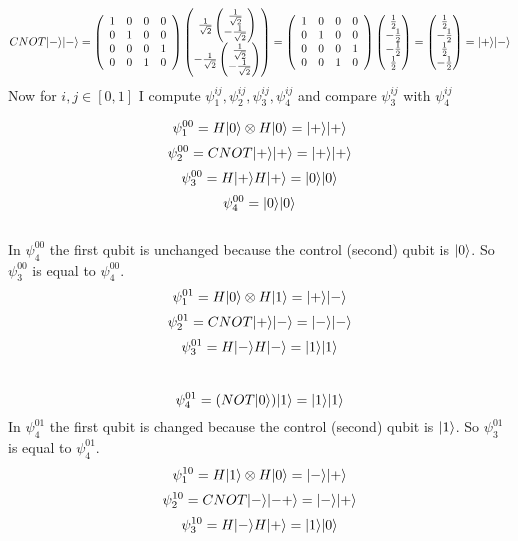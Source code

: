 \documentclass{article}
\DeclarePairedDelimiter\ket{\lvert}{\rangle}
\begin{document}
\[CNOT \ket{-}\ket{-}  =  \left(
    \begin{array}{cccc} 
        1 & 0 & 0 & 0\\
        0 & 1 & 0 & 0\\
        0 & 0 & 0 & 1\\
        0 & 0 & 1 & 0
    \end{array} 
\right)\begin{pmatrix} \frac{1}{\sqrt{2}} \begin{pmatrix} \frac{1}{\sqrt{2}} \\ -\frac{1}{\sqrt{2}} \end{pmatrix} \\ - \frac{1}{\sqrt{2}} \begin{pmatrix} \frac{1}{\sqrt{2}} \\ -\frac{1}{\sqrt{2}} \end{pmatrix} \end{pmatrix} = \left(
    \begin{array}{cccc} 
        1 & 0 & 0 & 0\\
        0 & 1 & 0 & 0\\
        0 & 0 & 0 & 1\\
        0 & 0 & 1 & 0
    \end{array} 
\right)\begin{pmatrix} \frac{1}{2} \\ -\frac{1}{2} \\ -\frac{1}{2} \\ \frac{1}{2}  \end{pmatrix} = \begin{pmatrix} \frac{1}{2} \\ -\frac{1}{2} \\ \frac{1}{2} \\ -\frac{1}{2}  \end{pmatrix} = \ket{+}\ket{-}\]
Now for $i,j \in [0,1]$ I compute $\psi_{1}^{ij}, \psi_{2}^{ij}, \psi_{3}^{ij}, \psi_{4}^{ij}$ and compare $\psi_{3}^{ij}$ with $\psi_{4}^{ij}$

\[\psi_{1}^{00} = H\ket{0} \otimes H\ket{0} = \ket{+}\ket{+}\]
\[\psi_{2}^{00} = CNOT \ket{+}\ket{+} = \ket{+}\ket{+}\]
\[\psi_{3}^{00} = H\ket{+}H\ket{+} = \ket{0}\ket{0}\]
\[\psi_{4}^{00} = \ket{0}\ket{0} \] \\
 In $\psi_{4}^{00}$ the first qubit is unchanged because the control (second) qubit is $\ket{0}$. So $\psi_{3}^{00}$ is equal to $\psi_{4}^{00}$.
 \\
\[\psi_{1}^{01} = H\ket{0} \otimes H\ket{1} = \ket{+}\ket{-}\]
\[\psi_{2}^{01} = CNOT \ket{+}\ket{-} = \ket{-}\ket{-}\]
\[\psi_{3}^{01} = H\ket{-}H\ket{-} = \ket{1}\ket{1}\]
\\
\[\psi_{4}^{01} = (NOT\ket{0})\ket{1} = \ket{1}\ket{1} \] In $\psi_{4}^{01}$ the first qubit is changed because the control (second) qubit is $\ket{1}$. So $\psi_{3}^{01}$ is equal to $\psi_{4}^{01}$.
\\
\[\psi_{1}^{10} = H\ket{1} \otimes H\ket{0} = \ket{-}\ket{+}\]
\[\psi_{2}^{10} = CNOT \ket{-}\ket{-+} = \ket{-}\ket{+}\]
\[\psi_{3}^{10} = H\ket{-}H\ket{+} = \ket{1}\ket{0}\]
\end{document}
